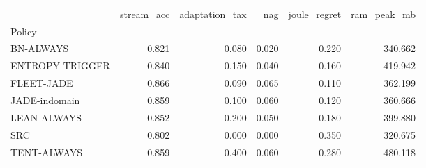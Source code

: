 \begin{tabular}{lrrrrr}
\toprule
 & stream_acc & adaptation_tax & nag & joule_regret & ram_peak_mb \\
Policy &  &  &  &  &  \\
\midrule
BN-ALWAYS & 0.821 & 0.080 & 0.020 & 0.220 & 340.662 \\
ENTROPY-TRIGGER & 0.840 & 0.150 & 0.040 & 0.160 & 419.942 \\
FLEET-JADE & 0.866 & 0.090 & 0.065 & 0.110 & 362.199 \\
JADE-indomain & 0.859 & 0.100 & 0.060 & 0.120 & 360.666 \\
LEAN-ALWAYS & 0.852 & 0.200 & 0.050 & 0.180 & 399.880 \\
SRC & 0.802 & 0.000 & 0.000 & 0.350 & 320.675 \\
TENT-ALWAYS & 0.859 & 0.400 & 0.060 & 0.280 & 480.118 \\
\bottomrule
\end{tabular}
